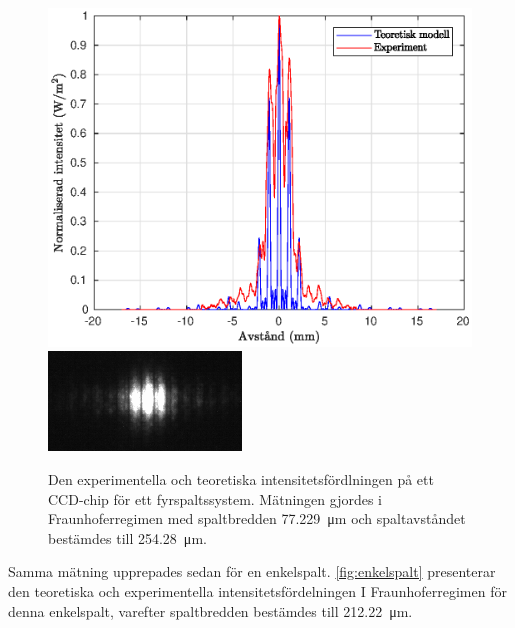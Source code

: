 \documentclass[a4paper]{article}
\begin{document}
\begin{figure}[h!]
	\centering
	\includegraphics[width=0.75\linewidth]{Data/Figurer/4spalt.eps}
	\includegraphics[width=0.5\linewidth]{Data/Figurer/4spalt.png}
	\caption{Den experimentella och teoretiska intensitetsfördlningen på ett CCD-chip för ett fyrspaltssystem. Mätningen gjordes i Fraunhoferregimen med spaltbredden \SI{77.229}{\micro\meter} och spaltavståndet bestämdes till \SI{254.28}{\micro \meter}.}
	\label{fig:4spalt}
\end{figure}

\FloatBarrier

Samma mätning upprepades sedan för en enkelspalt. \autoref{fig:enkelspalt} presenterar den teoretiska och experimentella intensitetsfördelningen I Fraunhoferregimen för denna enkelspalt, varefter spaltbredden bestämdes till \SI{212.22}{\micro\m}.

\FloatBarrier
\end{document}
